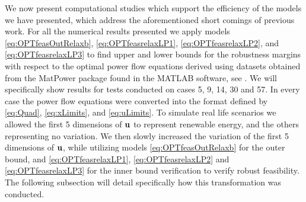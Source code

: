 We now present computational studies which support the efficiency of the models we have presented, which address the aforementioned short comings of previous work. 
For all the numerical results presented we apply models \eqref{eq:OPTfeasOutRelaxb}, \eqref{eq:OPTfeasrelaxLP1}, \eqref{eq:OPTfeasrelaxLP2}, and \eqref{eq:OPTfeasrelaxLP3} to find upper and lower bounds for the robustness margins with respect to the optimal power flow equations derived using datasets obtained from the MatPower package found in the MATLAB software, see \cite{matpower}. 
We will specifically show results for tests conducted on cases 5, 9, 14, 30 and 57. 
In every case the power flow equations were converted into the format defined by \eqref{eq:Quad}, \eqref{eq:xLimits}, and \eqref{eq:uLimits}. 
To simulate real life scenarios we allowed the first 5 dimensions of $\mathbf{u}$ to represent renewable energy, and the others representing no variation. We then slowly increased the variation of the first 5 dimensions of $\mathbf{u}$, while utilizing models \eqref{eq:OPTfeasOutRelaxb} for the outer bound, and \eqref{eq:OPTfeasrelaxLP1}, \eqref{eq:OPTfeasrelaxLP2} and \eqref{eq:OPTfeasrelaxLP3} for the inner bound verification to verify robust feasibility. 
The following subsection will detail specifically how this transformation was conducted.

